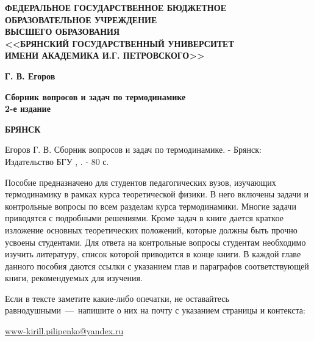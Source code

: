 \documentclass[14pt,a4paper, oneside]{memoir}
\numberwithin{equation}{section} %
\begin{document}
\thispagestyle{empty}
\begin{center}
  \textbf{ФЕДЕРАЛЬНОЕ ГОСУДАРСТВЕННОЕ БЮДЖЕТНОЕ \\ ОБРАЗОВАТЕЛЬНОЕ УЧРЕЖДЕНИЕ \\ ВЫСШЕГО ОБРАЗОВАНИЯ \\
  <<БРЯНСКИЙ ГОСУДАРСТВЕННЫЙ УНИВЕРСИТЕТ \\ ИМЕНИ АКАДЕМИКА И.Г. ПЕТРОВСКОГО>>}
  
  \vspace{0pt plus4fill}
  
  \textbf{\large Г. В. Егоров}

  \vspace{0pt plus1fill}

  \textbf{\Large Сборник вопросов и задач по термодинамике \\ 2-е издание}

  \vspace{0pt plus4fill}

  \textbf{БРЯНСК \the\year}
\end{center}
\clearpage
{}
\tableofcontents
{} %
\clearpage



Егоров Г. В. Сборник вопросов и задач по термодинамике. - Брянск:
Издательство БГУ , \the\year. - 80 с.

Пособие предназначено для студентов педагогических вузов, изучающих
термодинамику в рамках курса теоретической физики. В него включены
задачи и контрольные вопросы по всем разделам курса термодинамики.
Многие задачи приводятся с подробными решениями. Кроме задач в книге
дается краткое изложение основных теоретических положений, которые
должны быть прочно усвоены студентами. Для ответа на контрольные вопросы
студентам необходимо изучить литературу, список которой приводится в
конце книги. В каждой главе данного пособия даются ссылки с указанием
глав и параграфов соответствующей книги, рекомендуемых для изучения.

Если в тексте заметите какие-либо опечатки, не оставайтесь равнодушными~---~напишите о них на почту с указанием страницы и контекста:

\href{mailto:www-kirill.pilipenko@yandex.ru}{www-kirill.pilipenko@yandex.ru}

\end{document}
